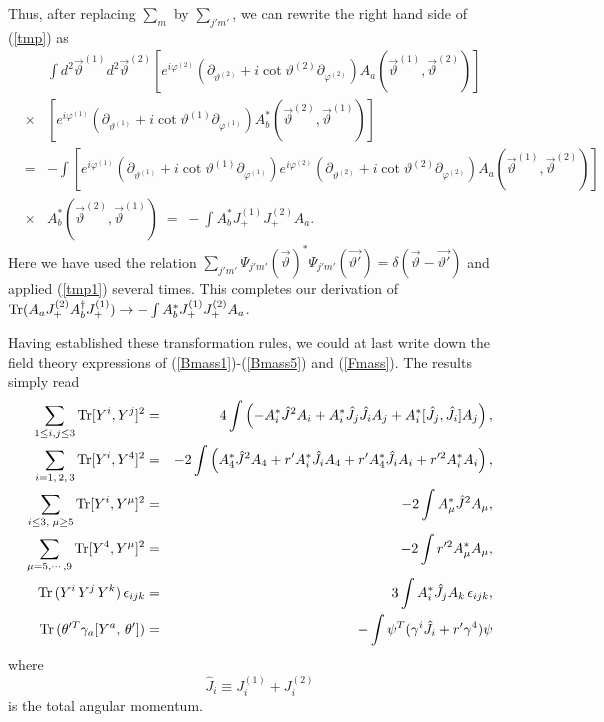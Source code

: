 \documentclass[a4paper,12pt]{article}
\begin{document}
{Thus, after replacing $\sum_{m}$ by $\sum_{j'm'}$, we can rewrite the right hand side of (\ref{tmp}) as
\begin{eqnarray}
& &\int d^{2}\vec{\vartheta}^{(1)}d^{2}\vec{\vartheta}^{(2)}
\left[e^{i\varphi^{(2)}} \left( \partial_{\vartheta^{(2)}} 
               + i \cot \vartheta^{(2)} \partial_{\varphi^{(2)}}\right)A_{a}(\vec{\vartheta}^{(1)},\vec{\vartheta}^{(2)})\right]\nonumber\\
&\times &\left[e^{i\varphi^{(1)}} \left( \partial_{\vartheta^{(1)}} 
               + i \cot \vartheta^{(1)} \partial_{\varphi^{(1)}}\right)A^{*}_{b}(\vec{\vartheta}^{(2)},\vec{\vartheta}^{(1)})\right]\nonumber\\
&=&-\int\left[e^{i\varphi^{(1)}} \left( \partial_{\vartheta^{(1)}} 
               + i \cot \vartheta^{(1)} \partial_{\varphi^{(1)}}\right)e^{i\varphi^{(2)}} \left( \partial_{\vartheta^{(2)}} 
               + i \cot \vartheta^{(2)} \partial_{\varphi^{(2)}}\right)A_{a}(\vec{\vartheta}^{(1)},\vec{\vartheta}^{(2)})\right]\nonumber\\
&\times&A^{*}_{b}(\vec{\vartheta}^{(2)},\vec{\vartheta}^{(1)})\;=\;-\int A^{*}_{b}J^{(1)}_{+}J^{(2)}_{+}A_{a}.
\label{tmp3}
\end{eqnarray}
Here we have used the relation
$\sum_{j'm'}\Psi_{j'm'}(\vec{\vartheta})^{*}\Psi_{j'm'}(\vec{\vartheta'})=\delta(\vec{\vartheta}-\vec{\vartheta'})$ and applied
(\ref{tmp1}) several times. This completes our derivation of ${\rm Tr}(A_{a}J^{(2)}_{+}A^{\dag}_{b}J^{(1)}_{+}) \rightarrow -\int A^{*}_{b}J^{(1)}_{+}J^{(2)}_{+}A_{a}$.

Having established these transformation rules, we could at last write down the field theory expressions of (\ref{Bmass1})-(\ref{Bmass5}) and (\ref{Fmass}). The results simply read
\begin{eqnarray}
\sum_{1\leq i,j\leq 3}{\rm Tr}[Y^{i},Y^{j}]^{2}&=&4\int\left(-A^{*}_{i}\hat{J}^{2}A_{i}+A^{*}_{i}\hat{J}_{j}\hat{J}_{i}A_{j}+A^{*}_{i}[\hat{J}_{j},\hat{J}_{i}]A_{j}\right),\nonumber\\
\sum_{i=1,\,2,\,3}{\rm Tr}[Y^{i},Y^{4}]^{2} &=& -2\int\left(A^{*}_{4}\hat{J}^{2}A_{4}+r'A^{*}_{i}\hat{J}_{i}A_{4}+r'A^{*}_{4}\hat{J}_{i}A_{i}+r'^{2}A^{*}_{i}A_{i}\right),\nonumber\\
\sum_{i\leq 3,\;\mu\geq 5}{\rm Tr}[Y^{i},Y^{\mu}]^{2} &=& -2\int A^{*}_{\mu}\hat{J}^{2}A_{\mu},\nonumber\\
\sum_{\mu=5,\cdots,9}{\rm Tr}[Y^{4},Y^{\mu}]^{2} &=& -2\int r'^{2}A^{*}_{\mu}A_{\mu},\nonumber\\
{\rm Tr}\,(Y^{i}\,Y^{j}\,Y^{k})\,\epsilon_{ijk} &=& 3\int A^{*}_{i}\hat{J}_{j}A_{k}\,\epsilon_{ijk},\nonumber\\
{\rm Tr}\,(\theta'^{T}\gamma_{a}[Y^{a},\,\theta']) &=&-\int\psi^{T}(\gamma^{i}\hat{J}_{i}+r'\gamma^{4})\psi
\label{field}
\end{eqnarray}
where
\begin{equation}
\hat{J}_{i}\equiv J^{(1)}_{i}+J^{(2)}_{i}
\label{tot}
\end{equation}
is the total angular momentum. 

}
\end{document}
